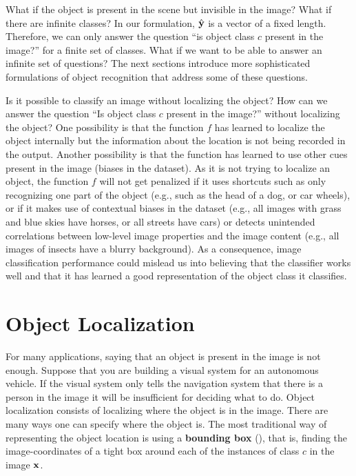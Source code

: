 What if the object is present in the scene but invisible in the image? What if there are infinite classes? In our formulation, $\hat {\bf y}$ is a vector of a fixed length. Therefore, we can only answer the question ``is object class $c$ present in the image?'' for a finite set of classes. What if we want to be able to answer an infinite set of questions? The next sections introduce more sophisticated formulations of object recognition that address some of these questions.


Is it possible to classify an image without localizing the object? How can we answer  the question ``Is object class $c$ present in the image?'' without localizing the object? One possibility is that the function $f$ has learned to localize the object internally but the information about the location is not being recorded in the output. Another possibility is that the function has learned to use other cues present in the image (biases in the dataset). As it is not trying to localize an object, the function $f$ will not get penalized if it uses shortcuts such as only recognizing one part of the object (e.g., such as the head of a dog, or car wheels), or if it makes use of contextual biases in the dataset (e.g., all images with grass and blue skies have horses, or all streets have cars) or detects unintended correlations between low-level image properties and the image content (e.g., all images of insects have a blurry background). As a consequence, image classification performance could mislead us into believing that the classifier works well and that it has learned a good representation of the object class it classifies.




\section{Object Localization}

For many applications, saying that an object is present in the image is not enough. Suppose that you are building a visual system for an autonomous vehicle. If the visual system only tells the navigation system that there is a person in the image it will be insufficient for deciding what to do. Object localization consists of localizing where the object is in the image. There are many ways one can specify where the object is. The most traditional way of representing the object location is using a {\bf bounding box} (\fig{\ref{fig:object_detection_bb}}), that is, finding the image-coordinates of a tight box around each of the instances of class $c$ in the image $\bf x$.



